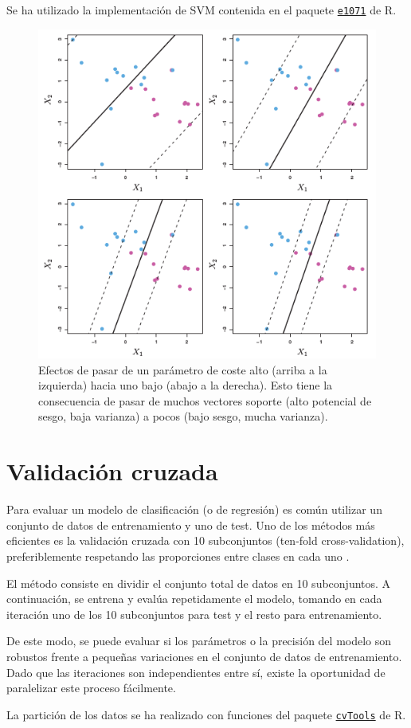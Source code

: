 \documentclass[12pt]{scrartcl}
\begin{document}
Se ha utilizado la implementación de SVM contenida en el paquete \href{http://cran.r-project.org/web/packages/e1071/index.html}{\texttt{e1071}} de R.

\begin{figure}[h]
\centering
\includegraphics [width=12 cm]{svmcost}
\caption{Efectos de pasar de un parámetro de coste alto (arriba a la izquierda) hacia uno bajo (abajo a la derecha). Esto tiene la consecuencia de pasar de muchos vectores soporte (alto potencial de sesgo, baja varianza) a pocos (bajo sesgo, mucha varianza).}
\label{fig:coste}
\end{figure}

\clearpage
\section{Validación cruzada}
Para evaluar un modelo de clasificación (o de regresión) es común utilizar un conjunto de datos de entrenamiento y uno de test. Uno de los métodos más eficientes es la validación cruzada con 10 subconjuntos (ten-fold cross-validation), preferiblemente respetando las proporciones entre clases en cada uno \cite{khv}.\par
El método consiste en dividir el conjunto total de datos en 10 subconjuntos. A continuación, se entrena y evalúa repetidamente el modelo, tomando en cada iteración uno de los 10 subconjuntos para test y el resto para entrenamiento.\par
De este modo, se puede evaluar si los parámetros o la precisión del modelo son robustos frente a pequeñas variaciones en el conjunto de datos de entrenamiento. Dado que las iteraciones son independientes entre sí, existe la oportunidad de paralelizar este proceso fácilmente.\par
La partición de los datos se ha realizado con funciones del paquete \href{http://cran.r-project.org/web/packages/cvTools/index.html}{\texttt{cvTools}} de R.\par
\end{document}
